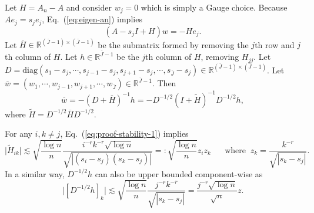 \documentclass[11pt,a4paper]{article}
\renewcommand{\tilde}{\widetilde}
\renewcommand{\bar}{\overline}
\theoremstyle{definition}
\theoremstyle{plain}
\theoremstyle{remark}
\newcommand{\diag}{\mathrm{diag}}
\begin{document}
Let $H=A_n-A$ and consider $w_j=0$ which is simply a Gauge choice. Because $Ae_j=s_je_j$, Eq.~(\ref{eq:eigen-an}) implies
$$
(A-s_j I+H)w = -He_j.
$$
Let $\bar H\in\mathbb R^{(\bar J-1)\times (\bar J-1)}$ be the submatrix formed by removing the $j$th row and $j$th column of $H$. Let $h\in\mathbb R^{\bar J-1}$ be the $j$th column of $H$, removing $H_{jj}$.
Let $D=\diag(s_1-s_j,\cdots,s_{j-1}-s_j,s_{j+1}-s_j,\cdots,s_{\bar J}-s_j)\in\mathbb R^{(\bar J-1)\times(\bar J-1)}$. Let $\bar w=(w_1,\cdots,w_{j-1},w_{j+1},\cdots,w_{\bar J})\in\mathbb R^{\bar J-1}$. Then
$$
\bar w = -(D+\bar H)^{-1}h = -D^{-1/2}(I+\tilde H)^{-1}D^{-1/2}h,
$$
where $\tilde H = D^{-1/2} \bar H D^{-1/2}$. 

For any $i,k\neq j$, Eq.~(\ref{eq:proof-stability-1}) implies
$$
\big|\tilde H_{ik}\big| \lesssim \sqrt{\frac{\log n}{n}} \frac{i^{-r}k^{-r}\sqrt{\log n}}{\sqrt{|(s_i-s_j)(s_k-s_j)|}} =: \sqrt{\frac{\log n}{n}}z_iz_k\;\;\;\;\;\;\text{where}\;\; z_k = \frac{k^{-r}}{\sqrt{|s_k-s_j|}}.
$$
In a similar way, $D^{-1/2}h$ can also be upper bounded component-wise as
\begin{equation}
\big|[D^{-1/2}h]_k \big| \lesssim  \sqrt{\frac{\log n}{n}}\frac{j^{-r}k^{-r}}{\sqrt{|s_k-s_j|}} = \frac{j^{-r}\sqrt{\log n}}{\sqrt{n}}z.
\label{eq:proof-stability-3}
\end{equation}
\end{document}
